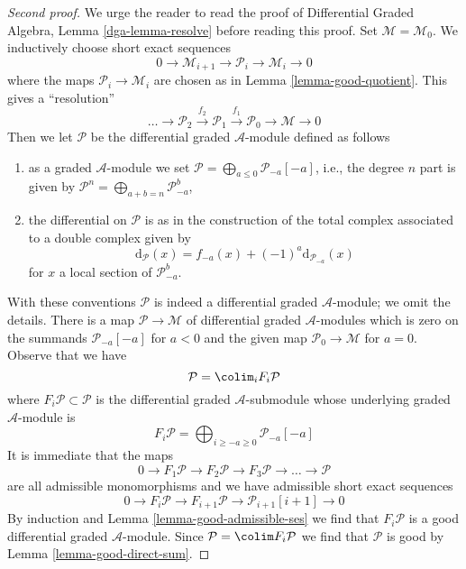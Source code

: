 \begin{proof}[Second proof]
We urge the reader to read the proof of Differential Graded Algebra,
Lemma \ref{dga-lemma-resolve} before reading this proof.
Set $\mathcal{M} = \mathcal{M}_0$.
We inductively choose short exact sequences
$$
0 \to \mathcal{M}_{i + 1} \to \mathcal{P}_i \to \mathcal{M}_i \to 0
$$
where the maps
$\mathcal{P}_i \to \mathcal{M}_i$ are chosen as in
Lemma \ref{lemma-good-quotient}.
This gives a ``resolution''
$$
\ldots \to \mathcal{P}_2 \xrightarrow{f_2}
\mathcal{P}_1 \xrightarrow{f_1} \mathcal{P}_0 \to \mathcal{M} \to 0
$$
Then we let $\mathcal{P}$ be the differential graded
$\mathcal{A}$-module defined as follows
\begin{enumerate}
\item as a graded $\mathcal{A}$-module we set
$\mathcal{P} = \bigoplus_{a \leq 0} \mathcal{P}_{-a}[-a]$, i.e.,
the degree $n$ part is given by
$\mathcal{P}^n = \bigoplus\nolimits_{a + b = n} \mathcal{P}_{-a}^b$,
\item the differential on $\mathcal{P}$ is as in the construction of
the total complex associated to a double complex given by
$$
\text{d}_\mathcal{P}(x) = f_{-a}(x) + (-1)^a \text{d}_{\mathcal{P}_{-a}}(x)
$$
for $x$ a local section of $\mathcal{P}_{-a}^b$.
\end{enumerate}
With these conventions $\mathcal{P}$ is indeed a
differential graded $\mathcal{A}$-module; we omit the details.
There is a map $\mathcal{P} \to \mathcal{M}$ of differential graded
$\mathcal{A}$-modules which is zero on the summands $\mathcal{P}_{-a}[-a]$
for $a < 0$ and the given map $\mathcal{P}_0 \to \mathcal{M}$ for $a = 0$.
Observe that we have
$$
\mathcal{P} = \colim_i F_i\mathcal{P}
$$
where $F_i\mathcal{P} \subset \mathcal{P}$ is the differential
graded $\mathcal{A}$-submodule whose underlying graded $\mathcal{A}$-module
is
$$
F_i\mathcal{P} =
\bigoplus\nolimits_{i \geq -a \geq 0} \mathcal{P}_{-a}[-a]
$$
It is immediate that the maps
$$
0 \to F_1\mathcal{P} \to F_2\mathcal{P} \to F_3\mathcal{P} \to
\ldots \to \mathcal{P}
$$
are all admissible monomorphisms and we have admissible short exact sequences
$$
0 \to F_i\mathcal{P} \to
F_{i + 1}\mathcal{P} \to
\mathcal{P}_{i + 1}[i + 1] \to 0
$$
By induction and Lemma \ref{lemma-good-admissible-ses}
we find that $F_i\mathcal{P}$ is a good differential graded
$\mathcal{A}$-module. Since $\mathcal{P} = \colim F_i\mathcal{P}$
we find that $\mathcal{P}$ is good by Lemma \ref{lemma-good-direct-sum}.


\end{proof}

